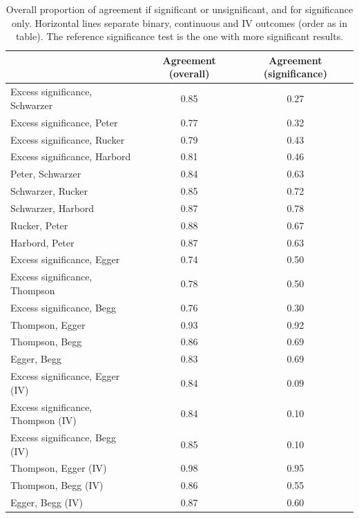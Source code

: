 \documentclass[11pt,a4paper,twoside]{book}\usepackage[]{graphicx}\usepackage[]{color}
\begin{document}
\begin{table}[ht]
\centering
\begingroup\scriptsize
\begin{tabular}{lcc}
  \hline
 & Agreement (overall) & Agreement (significance) \\ 
  \hline
Excess significance, Schwarzer & 0.85 & 0.27 \\ 
  Excess significance, Peter & 0.77 & 0.32 \\ 
  Excess significance, Rucker & 0.79 & 0.43 \\ 
  Excess significance, Harbord & 0.81 & 0.46 \\ 
  Peter, Schwarzer & 0.84 & 0.63 \\ 
  Schwarzer, Rucker & 0.85 & 0.72 \\ 
  Schwarzer, Harbord & 0.87 & 0.78 \\ 
  Rucker, Peter & 0.88 & 0.67 \\ 
  Harbord, Peter & 0.87 & 0.63 \\ 
  Excess significance, Egger & 0.74 & 0.50 \\ 
  Excess significance, Thompson & 0.78 & 0.50 \\ 
  Excess significance, Begg & 0.76 & 0.30 \\ 
  Thompson, Egger & 0.93 & 0.92 \\ 
  Thompson, Begg & 0.86 & 0.69 \\ 
  Egger, Begg & 0.83 & 0.69 \\ 
  Excess significance, Egger (IV) & 0.84 & 0.09 \\ 
  Excess significance, Thompson (IV) & 0.84 & 0.10 \\ 
  Excess significance, Begg (IV) & 0.85 & 0.10 \\ 
  Thompson, Egger (IV) & 0.98 & 0.95 \\ 
  Thompson, Begg (IV) & 0.86 & 0.55 \\ 
  Egger, Begg (IV) & 0.87 & 0.60 \\ 
   \hline
\end{tabular}
\endgroup
\caption{Overall proportion of agreement if significant or unsignificant, and for significance only. Horizontal lines separate binary, continuous and IV outcomes (order as in table). The reference significance test is the one with more significant results.} 
\label{test.agreement}
\end{table}
\end{document}
